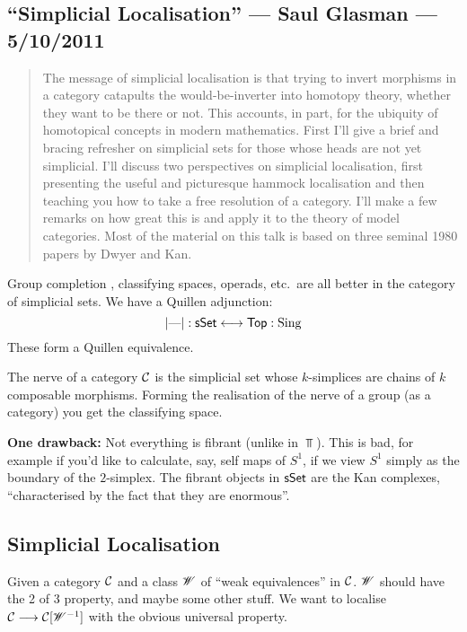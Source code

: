 \documentclass[11pt]{article}
\newcommand{\KanSemResponse}[1]
{
\thispagestyle{fancy}
\subsection*{#1}
}
\begin{document}
\begin{SaulSimplicialLocalisation}
\KanSemResponse
{``Simplicial Localisation'' --- Saul Glasman --- 5/10/2011}
\begin{abstract}
The message of simplicial localisation is that trying to invert 
morphisms in a category catapults the would-be-inverter into homotopy 
theory, whether they want to be there or not. This accounts, in part, 
for the ubiquity of homotopical concepts in modern mathematics. First 
I'll give a brief and bracing refresher on simplicial sets for those 
whose heads are not yet simplicial. I'll discuss two perspectives on 
simplicial localisation, first presenting the useful and picturesque 
hammock localisation and then teaching you how to take a free resolution 
of a category. I'll make a few remarks on how great this is and apply it 
to the theory of model categories. Most of the material on this talk is 
based on three seminal 1980 papers by Dwyer and Kan.
\end{abstract}
Group completion , classifying spaces, operads, etc.\ are all better in the category of simplicial sets. We have a Quillen adjunction:
\[|\textup{---}|:\operatorname{{\mathsf{sSet}}}\longleftrightarrow\operatorname{{\mathsf{Top}}}:\operatorname{Sing}\]
These form a Quillen equivalence.
\begin{exmp*}
The nerve of a category $\mathcal{C}$ is the simplicial set whose $k$-simplices are chains of $k$ composable morphisms. Forming the realisation of the nerve of a group (as a category) you get the classifying space.
\end{exmp*}
\noindent \textbf{One drawback:} Not everything is fibrant (unlike in $\Top$).
This is bad, for example if you'd like to calculate, say, self maps of $S^1$, if we view $S^1$ simply as the boundary of the $2$-simplex.
The fibrant objects in $\operatorname{{\mathsf{sSet}}}$ are the Kan complexes, ``characterised by the fact that they are enormous''.
\subsection*{Simplicial Localisation}
Given a category $\mathcal{C}$ and a class $\mathscr{W}$ of ``weak equivalences'' in $\mathcal{C}$. $\mathscr{W}$ should have the 2 of 3 property, and maybe some other stuff. We want to localise $\mathcal{C}\longrightarrow\mathcal{C}[\mathscr{W}^{-1}]$ with the obvious universal property.


\end{SaulSimplicialLocalisation}
\end{document}
